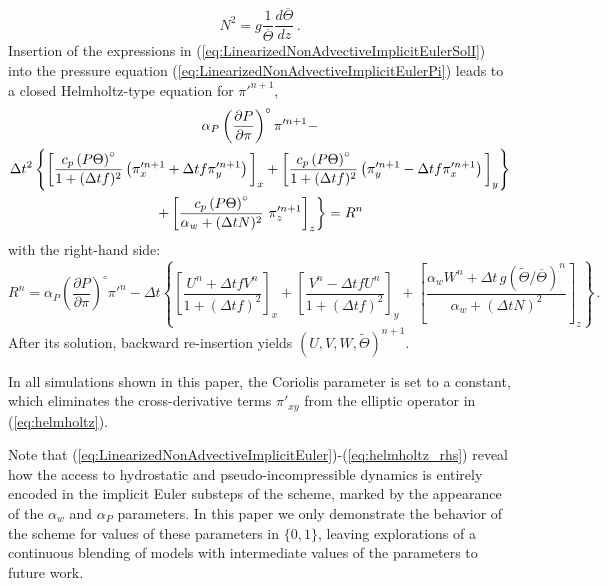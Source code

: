 \documentclass{ametsoc}
\theoremstyle{definition}
\newcommand{\eq}[1]{(\ref{#1})}
\newcommand{\dt}{\Delta t}
\newcommand{\Thetabar}{\overline{\Theta}}
\newcommand{\Thetatilde}{{\widetilde \Theta}}
\newcommand{\ahydro}{\alpha_{w}}
\newcommand{\apsinc}{\alpha_{P}}
\begin{document}
%
\begin{equation}
N^2 = g \frac{1}{\Thetabar}\frac{d\Thetabar}{dz}\,.
\end{equation}
%
Insertion of the expressions in \eq{eq:LinearizedNonAdvectiveImplicitEulerSolI}
into the pressure equation \eq{eq:LinearizedNonAdvectiveImplicitEulerPi} 
leads to a closed Helmholtz-type equation for ${\pi'}^{n+1}$, 
%
 \begin{multline}\label{eq:helmholtz}
 \apsinc \left(\dfrac{\partial P}{\partial\pi}\right)^{\circ}\pi'^{n+1} - \\
\dt^2 
\left\{ 
      \left[
        \dfrac{c_p \left(P\Theta\right)^{\circ}}{1+(\dt f)^2} 
          \left(\pi'^{n+1}_x+\dt f\pi'^{n+1}_y
          \right)
        \rule{0pt}{12pt}\right]_x
       +\left[
          \dfrac{c_p \left(P\Theta\right)^{\circ}}{1+(\dt f)^2} 
            \left(\pi'^{n+1}_y-\dt f\pi'^{n+1}_x
            \right)
         \rule{0pt}{12pt}\right]_y
      \right\}
    \\
    \left.
  + \left[\dfrac{c_p \left(P\Theta\right)^{\circ}}{\ahydro + (\dt N)^2} \ \pi'^{n+1}_z
      \rule{0pt}{12pt}\right]_z
    \right\}
  = R^n
 \end{multline}
%
with the right-hand side:
%
\begin{equation}\label{eq:helmholtz_rhs}
R^n= \apsinc \left(\dfrac{\partial P}{\partial\pi}\right)^{\circ}\pi'^n-
\dt
\left\{
\left[\dfrac{U^n +\dt f V^n}{1+(\dt f)^2}\right]_x  
+ \left[\dfrac{V^n - \dt f U^n}{1+(\dt f)^2}\right]_y
+\left[\dfrac{\ahydro W^n+\dt\, g\left(\Thetatilde/\Thetabar\right)^n}{\ahydro+(\dt N)^2}\right]_z\right\} \,.
\end{equation}
%
After its solution, backward re-insertion yields $(U, V, W, \Thetatilde)^{n+1}$.

In all simulations shown in this paper, the Coriolis parameter is set to a
constant, which eliminates the cross-derivative terms $\pi'_{xy}$ from
the elliptic operator in \eq{eq:helmholtz}.

Note that \eq{eq:LinearizedNonAdvectiveImplicitEuler}-\eq{eq:helmholtz_rhs}
reveal how the access to hydrostatic and pseudo-incompressible dynamics is entirely
encoded in the implicit Euler substeps of the scheme, marked by the appearance of 
the $\ahydro$ and $\apsinc$ parameters. In this paper we only demonstrate the behavior 
of the scheme for values of these parameters in $\{0,1\}$, leaving explorations of 
a continuous blending of models with intermediate values of the parameters to future 
work.

\end{document}
